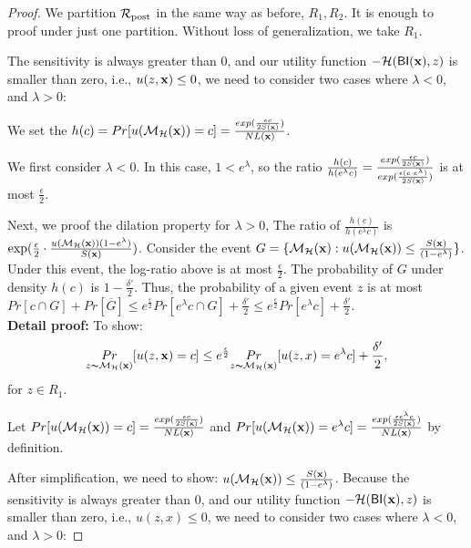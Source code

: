 \documentclass{article}
\begin{document}
\begin{proof}
We partition $\mathcal{R}_{\textup{post}}$ in the same way as before, $R_1, R_2$. It is enough to proof under just one partition. Without loss of generalization, we take $R_1$.

The sensitivity is always greater than 0, and our utility function $-\mathcal{H}(\mathsf{BI}(\textbf{x}),z)$ is smaller than zero, i.e., $u(z,\textbf{x}) \leq 0$, we need to consider two cases where $\lambda < 0$, and $\lambda > 0$:

We set the $h(c) = Pr[u(\mathcal{M}_{\mathcal{H}}(\textbf{x})) = c] = \frac{exp(\frac{\epsilon c}{2 S(\textbf{x})})}{NL(\textbf{x})}$.

We first consider $\lambda < 0$. In this case, $1 < e ^ {\lambda}$, so the ratio $\frac{h(c)}{h(e^{\lambda}c)} = \frac{exp(\frac{\epsilon c}{2 S(\textbf{x})})}{exp(\frac{\epsilon (c \cdot e^{\lambda})}{2 S(\textbf{x})})}$ is at most $\frac{\epsilon}{2}$.

Next, we proof the dilation property for $\lambda > 0$, The ratio of $\frac{h(c)}{h(e^{\lambda}c)}$ is $\exp(\frac{\epsilon}{2} \cdot \frac{u(\mathcal{M}_{\mathcal{H}}(\textbf{x})) (1 - e^{\lambda})}{S(\textbf{x})})$. Consider the event $G = \{ \mathcal{M}_{\mathcal{H}}(\textbf{x}) : u(\mathcal{M}_{\mathcal{H}}(\textbf{x})) \leq \frac{S(\textbf{x})}{(1 - e^{\lambda})}\}$. Under this event, the log-ratio above is at most $\frac{\epsilon}{2}$. The probability of $G$ under density $h(c)$ is $1 - \frac{\delta'}{2}$. Thus, the probability of a given event $z$ is at most $Pr[c \cap G] + Pr[\overline{G}] \leq e^{\frac{\epsilon}{2}} Pr[e^{\lambda}c \cap G] + \frac{\delta'}{2} \leq e^{\frac{\epsilon}{2}} Pr[e^{\lambda}c] + \frac{\delta'}{2}$.\\


\textbf{Detail proof:}
	To show:
	\begin{equation*}
	\underset{z \thicksim \mathcal{M}_{\mathcal{H}}(\textbf{x})}{Pr}[u(z,\textbf{x}) = c]
	\leq
	e^{\frac{\epsilon}{2}} \underset{z \thicksim \mathcal{M}_{\mathcal{H}}(\textbf{x})}{Pr}[u(z,x) = e^{\lambda} c] + \frac{\delta'}{2},
	\end{equation*}
	for $z \in R_1$.

	Let $Pr[u(\mathcal{M}_{\mathcal{H}}(\textbf{x})) = c] = \frac{exp(\frac{\epsilon c}{2 S(\textbf{x})})}{NL(\textbf{x})}$ and $Pr[u(\mathcal{M}_{\mathcal{H}}(\textbf{x})) = e^{\lambda} c] = \frac{exp(\frac{\epsilon e^{\lambda} c}{2 S(\textbf{x})})}{NL(\textbf{x})}$ by definition.

	After simplification, we need to show: $u(\mathcal{M}_{\mathcal{H}}(\textbf{x})) \leq \frac{S(\textbf{x})}{(1 - e ^ {\lambda})}$.
	Because the sensitivity is always greater than 0, and our utility function $-\mathcal{H}(\mathsf{BI}(\textbf{x}),z)$ is smaller than zero, i.e., $u(z,x) \leq 0$, we need to consider two cases where $\lambda < 0$, and $\lambda > 0$:


\end{proof}
\end{document}
